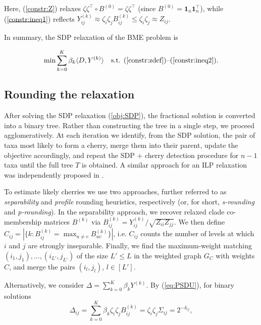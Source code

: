 \documentclass{article}
\begin{document}
\noindent
Here, (\ref{constr:Z}) relaxes
$\zeta\zeta^{\top}\!\circ B^{(0)}=\zeta\zeta^{\top}$
(since $B^{(0)}=\mathbf{1}_n\mathbf{1}_n^{\top}$),
while (\ref{constr:ineq1}) reflects
$Y_{ij}^{(k)}\approx \zeta_i\zeta_j B^{(k)}_{ij}
\le \zeta_i\zeta_j \approx Z_{ij}$.

In summary, the SDP relaxation of the BME problem is

\begin{equation}\label{obj:SDP}
\min \sum_{k=0}^K \beta_k \langle D, Y^{(k)} \rangle
\quad \text{s.t. } (\ref{constr:zdef})\text{--}(\ref{constr:ineq2}).
\end{equation}

\subsection{Rounding the relaxation}

After solving the SDP relaxation
(\ref{obj:SDP}), the fractional solution is converted into a binary tree. Rather than constructing the tree in a single step, we proceed agglomeratively. At each iteration we identify, from the SDP solution, the pair of taxa most likely to form a cherry, merge them into their parent,
update the objective accordingly, and repeat the SDP + cherry detection procedure for $n-1$ taxa until the full tree $T$ is obtained. A similar approach for an ILP relaxation was independently proposed
in \cite{catanzaro2025new}.

To estimate likely cherries we use two approaches, further referred to as {\it separability} and {\it profile} rounding heuristics, respectively (or, for short, {\it s-rounding} and {\it p-rounding}).
In the separability approach, we recover relaxed clade co-membership matrices
$B^{(k)}$ via
$B^{(k)}_{ij}=Y^{(k)}_{ij}/\sqrt{Z_{ii}Z_{jj}}$. We then define
$C_{ij}=|\{k: B^{(k)}_{ij}=\max_{u\ne v} B^{(k)}_{uv}\}|$,
i.e. $C_{ij}$ counts the number of levels at which $i$ and $j$
are strongly inseparable. Finally, we find the maximum-weight matching $(i_1,j_1),...,(i_{L'},j_{L'})$ of the size $L'\leq L$ in the weighted graph $G_C$ with weights $C$, and merge the pairs $(i_l,j_l)$, $l\in [L']$.

Alternatively, we consider
$\Delta=\sum_{k=0}^K \beta_k Y^{(k)}$.
By (\ref{eq:PSDU}), for binary solutions
\begin{equation}
\Delta_{ij}
= \sum_{k=0}^K \beta_k \zeta_i\zeta_j B_{ij}^{(k)}
= \zeta_i\zeta_j \Sigma_{ij}
= 2^{-\delta_{ij}},
\end{equation}
\end{document}
